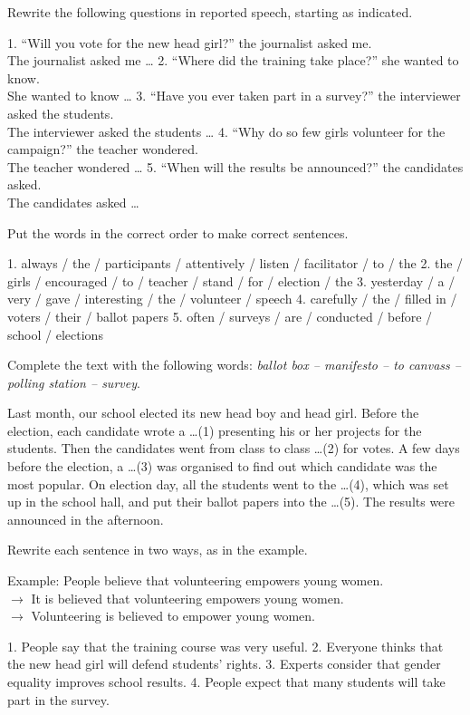 \documentclass[11pt]{article}
\begin{document}
\begin{exercice}
Rewrite the following questions in reported speech, starting as indicated.

1. ``Will you vote for the new head girl?'' the journalist asked me.\\
The journalist asked me \ldots
2. ``Where did the training take place?'' she wanted to know.\\
She wanted to know \ldots
3. ``Have you ever taken part in a survey?'' the interviewer asked the students.\\
The interviewer asked the students \ldots
4. ``Why do so few girls volunteer for the campaign?'' the teacher wondered.\\
The teacher wondered \ldots
5. ``When will the results be announced?'' the candidates asked.\\
The candidates asked \ldots
\end{exercice}

\begin{exercice}
Put the words in the correct order to make correct sentences.

1. always / the / participants / attentively / listen / facilitator / to / the
2. the / girls / encouraged / to / teacher / stand / for / election / the
3. yesterday / a / very / gave / interesting / the / volunteer / speech
4. carefully / the / filled in / voters / their / ballot papers
5. often / surveys / are / conducted / before / school / elections
\end{exercice}

\begin{exercice}
Complete the text with the following words: \emph{ballot box -- manifesto -- to canvass -- polling station -- survey}.

Last month, our school elected its new head boy and head girl. Before the election, each candidate wrote a \ldots (1) presenting his or her projects for the students. Then the candidates went from class to class \ldots (2) for votes. A few days before the election, a \ldots (3) was organised to find out which candidate was the most popular. On election day, all the students went to the \ldots (4), which was set up in the school hall, and put their ballot papers into the \ldots (5). The results were announced in the afternoon.
\end{exercice}

\begin{exercice}
Rewrite each sentence in two ways, as in the example.

Example: People believe that volunteering empowers young women.\\
$\rightarrow$ It is believed that volunteering empowers young women.\\
$\rightarrow$ Volunteering is believed to empower young women.

1. People say that the training course was very useful.
2. Everyone thinks that the new head girl will defend students' rights.
3. Experts consider that gender equality improves school results.
4. People expect that many students will take part in the survey.
\end{exercice}
\end{document}
